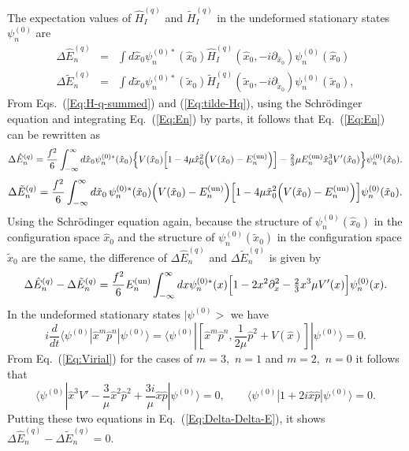 \documentclass[a4paper,12pt]{article}
\begin{document}
The  expectation values  of $\hat H^{(q)}_I$ and $\tilde H^{(q)}_I$ 
  in the undeformed stationary states $\psi^{(0)}_n$ are
\begin{eqnarray}                          
\label{Eq:En}  
\Delta \hat E^{(q)}_n &=& \int d\hat x_0 \psi_n^{(0)\ast}(\hat x_0 )
\hat H^{(q)}_I(\hat x_0,-i\partial_{\hat x_0} )\psi_n^{(0)}(\hat x_0 ) 
\nonumber\\
\Delta\tilde E^{(q)}_n &=& \int d\tilde x_0 \psi_n^{(0)\ast}(\tilde x_0)
\tilde H^{(q)}_I(\tilde x_0,-i\partial_{\tilde x_0}) \psi_n^{(0)}(\tilde x_0),
\end{eqnarray}  
 From Eqs.~(\ref{Eq:H-q-summed}) and (\ref{Eq:tilde-Hq}), 
using the Schr\"odinger equation and integrating Eq.~(\ref{Eq:En})  by parts, 
it follows that
 Eq.~(\ref{Eq:En}) can be rewritten as
\begin{equation}
\label{Eq:Delta-E-hat}
\Delta \hat E^{(q)}_n
=\frac{f^2}{6}\int_{-\infty}^\infty d\hat x_0 \psi^{(0)*}_n(\hat x_0)
\Bigl\{V(\hat x_0) \Bigl[1-4\mu\hat x_0 ^2 \Bigl(V(\hat x_0) 
-E^{\rm (un)}_n\Bigr)\Bigr]
-{\textstyle\frac{2}{3}}\mu E^{\rm(un)}_n  \hat x_0^3 V'(\hat x_0)\Bigr\}
\psi^{(0)}_n(\hat x_0).
\end{equation}
\begin{equation}
\label{Eq:Delta-E-tilde}
\Delta\tilde E^{(q)}_n
=\frac{f^2}{6}
\int_{-\infty}^\infty d\tilde x_0\, \psi^{(0)*}_n(\tilde x_0)
\Bigl(V(\tilde x_0)- E^{\rm (un)}_n\Bigr) \Bigl[ 1-
4\mu \tilde x_0^2\Bigl(V(\tilde x_0)-
E^{\rm (un)}_n\Bigr) \Bigr]\psi^{(0)}_n(\tilde x_0).
\end{equation}
Using the Schr\"odinger equation again,  because 
the structure of $\psi_n^{(0)}(\hat x_0)$ in the configuration space 
$\hat x_0$ and the structure of $\psi_n^{(0)}(\tilde x_0)$ in the 
configuration space $\tilde x_0$ are the same,
 the difference of
$\Delta \hat E^{(q)}_n$ and $\Delta\tilde E^{(q)}_n$  is given by
\begin{equation}
\label{Eq:Delta-Delta-E}
\Delta \hat E^{(q)}_n - \Delta\tilde E^{(q)}_n
=  \frac{f^2}{6}E^{\rm (un)}_n 
\int_{-\infty}^\infty dx \psi^{(0)*}_n(x)
\Bigl[1-2 x^2 \partial_x^2
-{\textstyle\frac{2}{3}} x^3\mu V'(x)\Bigr]\psi^{(0)}_n(x).
\end{equation}
In  the undeformed stationary states $|\psi^{(0)}>$ we have
\begin{equation}                          
\label{Eq:Virial}
i\frac{d}{dt} \langle \psi^{(0)}|\hat x^m\hat p^n|\psi^{(0)}\rangle
= \langle \psi^{(0)}|\left[ \hat x^m\hat p^n, 
\frac{1}{2\mu} \hat p^2+V(\hat x )\right]|\psi^{(0)}\rangle=0.
\end{equation}
From Eq.~(\ref{Eq:Virial}) for the cases of $m=3,$ $n=1$ and 
$m=2,$  $n=0$ it follows that 
\begin{equation} 
\langle \psi^{(0)}|\hat x^3 V'-\frac{3}{\mu}\hat x^2\hat p^2
+\frac{3i}{\mu}\hat x \hat p |\psi^{(0)}\rangle=0, \qquad
\langle \psi^{(0)}|1+2i\hat x \hat p|\psi^{(0)}\rangle = 0. \nonumber 
\end{equation}
Putting these two equations in Eq.~(\ref{Eq:Delta-Delta-E}), it shows 
$\Delta \hat E^{(q)}_n - \Delta\tilde E^{(q)}_n =0.$
\end{document}
